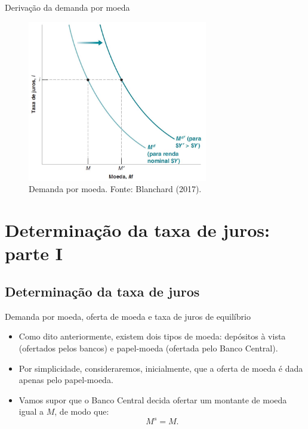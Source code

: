 \documentclass[10pt]{beamer}
\begin{document}
\begin{frame}{Derivação da demanda por moeda}
    \begin{figure}
        \centering
        \includegraphics[width=0.7\textwidth]{./figures/aula072_fig1.JPG}
        \caption{Demanda por moeda. Fonte: Blanchard (2017).}
        \label{fig1}
    \end{figure}
\end{frame}

\section{Determinação da taxa de juros: parte I}
\subsection{Determinação da taxa de juros}
\begin{frame}{Demanda por moeda, oferta de moeda e taxa de juros de equilíbrio}
    \begin{itemize}
        \item Como dito anteriormente, existem dois tipos de moeda: depósitos à vista (ofertados pelos bancos) e papel-moeda (ofertada pelo Banco Central).
        \bigskip
        \item Por simplicidade, consideraremos, inicialmente, que a oferta de moeda é dada apenas pelo papel-moeda.
        \bigskip
        \item Vamos supor que o Banco Central decida ofertar um montante de moeda igual a $M$, de modo que:
        \[
        M^s = M.
        \]
    \end{itemize}
\end{frame}
\end{document}

